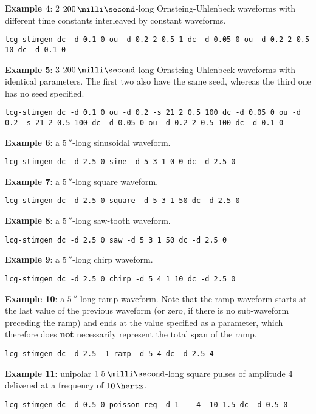 \textbf{Example 4}: 2 $200\,\milli\second$-long Ornsteing-Uhlenbeck
waveforms with different time constants interleaved by constant
waveforms.
\begin{lstlisting}
lcg-stimgen dc -d 0.1 0 ou -d 0.2 2 0.5 1 dc -d 0.05 0 ou -d 0.2 2 0.5 10 dc -d 0.1 0
\end{lstlisting}

\textbf{Example 5}: 3 $200\,\milli\second$-long Ornsteing-Uhlenbeck
waveforms with identical parameters. The first two also have the same
seed, whereas the third one has no seed specified.
\begin{lstlisting}
lcg-stimgen dc -d 0.1 0 ou -d 0.2 -s 21 2 0.5 100 dc -d 0.05 0 ou -d 0.2 -s 21 2 0.5 100 dc -d 0.05 0 ou -d 0.2 2 0.5 100 dc -d 0.1 0
\end{lstlisting}

\textbf{Example 6}: a $5\,\second$-long sinusoidal waveform.
\begin{lstlisting}
lcg-stimgen dc -d 2.5 0 sine -d 5 3 1 0 0 dc -d 2.5 0
\end{lstlisting}

\textbf{Example 7}: a $5\,\second$-long square waveform.
\begin{lstlisting}
lcg-stimgen dc -d 2.5 0 square -d 5 3 1 50 dc -d 2.5 0
\end{lstlisting}

\textbf{Example 8}: a $5\,\second$-long saw-tooth waveform.
\begin{lstlisting}
lcg-stimgen dc -d 2.5 0 saw -d 5 3 1 50 dc -d 2.5 0
\end{lstlisting}

\textbf{Example 9}: a $5\,\second$-long chirp waveform.
\begin{lstlisting}
lcg-stimgen dc -d 2.5 0 chirp -d 5 4 1 10 dc -d 2.5 0
\end{lstlisting}

\textbf{Example 10}: a $5\,\second$-long ramp waveform. Note that the
ramp waveform starts at the last value of the previous waveform (or
zero, if there is no sub-waveform preceding the ramp) and ends at the
value specified as a parameter, which therefore does \textbf{not}
necessarily represent the total span of the ramp.
\begin{lstlisting}
lcg-stimgen dc -d 2.5 -1 ramp -d 5 4 dc -d 2.5 4
\end{lstlisting}

\textbf{Example 11}: unipolar $1.5\,\milli\second$-long square pulses
of amplitude 4 delivered at a frequency of $10\,\hertz$.
\begin{lstlisting}
lcg-stimgen dc -d 0.5 0 poisson-reg -d 1 -- 4 -10 1.5 dc -d 0.5 0
\end{lstlisting}

